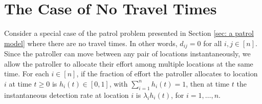 \documentclass[11pt,a4paper]{article}
\newcommand{\red}[1]{{\color{red}#1}}
\begin{document}






\section{The Case of No Travel Times} \label{sec: the case of no travel times}

Consider a special case of the patrol problem presented in Section \ref{sec: a patrol model} where there are no travel times.
In other words, $d_{ij} = 0$ for all $i,j \in [n]$.
Since the patroller can move between any pair of locations instantaneously, we allow the patroller to allocate their effort among multiple locations at the same time.
For each $i \in [n]$, if the fraction of effort the patroller allocates to location $i$ at time $t \geq 0$ is $h_i(t) \in [0,1]$, with $\sum_{i=1}^n h_i(t) = 1$, then at time $t$ the instantaneous detection rate at location $i$ is $\lambda_i h_i(t)$, for $i=1,\ldots,n$.
\end{document}
